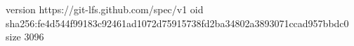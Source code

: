 version https://git-lfs.github.com/spec/v1
oid sha256:fe4d544f99183c92461ad1072d75915738fd2ba34802a3893071ccad957bbdc0
size 3096
